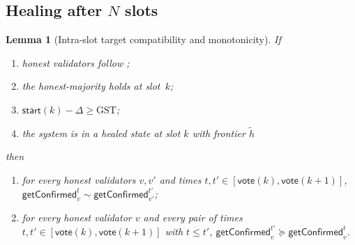 \ifx\litemode\undefined\documentclass{article}\fi
\newcommand{\start}{\ensuremath{\mathsf{start}}}
\newcommand{\vote}{\ensuremath{\mathsf{vote}}}
\newcommand{\GST}{\ensuremath{\mathrm{GST}}\xspace}
\newcommand{\comm}[1]{\ensuremath{\widetilde{#1}}}
\newcommand{\getConfirmed}{\textsf{getConfirmed}\xspace}
\theoremstyle{plain}
\newtheorem{lemma}{Lemma}
\theoremstyle{definition}
\theoremstyle{remark}
\begin{document}
\subsection{Healing after $N$ slots}

\iffalse
\begin{lemma}[Intra-slot target compatibility and monotonicity]\label{rev:lem:intra-slot-target-compat-monotone}
If
\begin{enumerate}
  \item\label{rev:istcm:f} honest validators follow ;
  \item\label{rev:istcm:ohm} the honest-majority holds at slot~$k$;
  \item\label{rev:istcm:sync} $\start(k) - \Delta \geq \GST$;
  \item\label{rev:istcm:hs} the system is in a healed state at slot $k$ with frontier $\comm{h}$
\end{enumerate}
then
\begin{enumerate}
  \item for every honest validators $v, v'$ and times $t, t' \in [\vote(k), \vote(k+1)]$, $\getConfirmed_v^t \sim \getConfirmed_{v'}^{t'}$;
  \item for every honest validator $v$ and every pair of times $t, t' \in [\vote(k), \vote(k+1)]$ with $t \leq t'$, $\getConfirmed_v^{t'} \succeq \getConfirmed_v^t$.
\end{enumerate}
\end{lemma}
\end{document}
